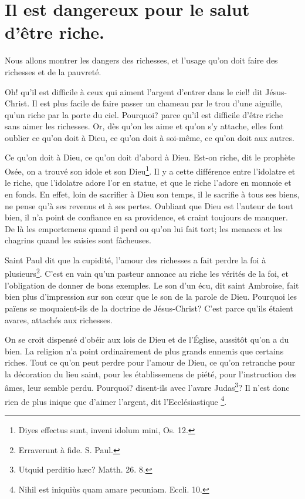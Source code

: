 \documentclass[instructions.tex]{subfiles}
\begin{document}
 
\chapter{Il est dangereux pour le salut d’être riche.}
 
Nous allons montrer les dangers des richesses, et l’usage qu’on doit faire des richesses et de la pauvreté.
 
\primo Oh! qu’il est difficile à ceux qui aiment l’argent d’entrer dans le ciel! dit Jésus-Christ. Il est plus facile de faire passer un chameau par le trou d’une aiguille, qu’un riche par la porte du ciel. Pourquoi? parce qu’il est difficile d’être riche sans aimer les richesses. Or, dès qu’on les aime et qu’on s’y attache, elles font oublier ce qu’on doit à Dieu, ce qu’on doit à soi-même, ce qu’on doit aux autres.
 
Ce qu’on doit à Dieu, ce qu’on doit d’abord à Dieu. Est-on riche, dit le prophète Osée, on a trouvé son idole et son Dieu\footnote{Diyes effectus sunt, inveni idolum mini, Os. 12.}. Il y a cette différence entre l’idolatre et le riche, que l’idolatre adore l’or en statue, et que le riche l’adore en monnoie et en fonds. En effet, loin de sacrifier à Dieu son temps, il le sacrifie à tous ses biens, ne pense qu’à ses revenus et à ses pertes. Oubliant que Dieu est l’auteur de tout bien, il n’a point de confiance en sa providence, et craint toujours de manquer. De là les emportemens quand il perd ou qu’on lui fait tort; les menaces et les chagrins quand les saisies sont fâcheuses.
 
Saint Paul dit que la cupidité, l’amour des richesses a fait perdre la foi à plusieurs\footnote{Erraverunt à fide. S. Paul.}. C’est en vain qu’un pasteur annonce au riche les vérités de la foi, et l’obligation de donner de bons exemples. Le son d’un écu, dit saint Ambroise, fait bien plus d’impression sur son cœur que le son de la parole de Dieu. Pourquoi les païens se moquaient-ils de la doctrine de Jésus-Christ? C’est parce qu’ils étaient avares, attachés aux richesses.
 
On se croit dispensé d’obéir aux lois de Dieu et de l’Église, aussitôt qu’on a du bien. La religion n’a point ordinairement de plus grands ennemis que certains riches. Tout ce qu’on peut perdre pour l’amour de Dieu, ce qu’on retranche pour la décoration du lieu saint, pour les établissemens de piété, pour l’instruction des âmes, leur semble perdu. Pourquoi? disent-ils avec l’avare Judas\footnote{ Utquid perditio hæc? Matth. 26. 8.}? Il n’est donc rien de plus inique que d’aimer l’argent, dit l’Ecclésiastique \footnote{ Nihil est iniquiùs quam amare pecuniam. Eccli. 10.}.
 
\end{document}
